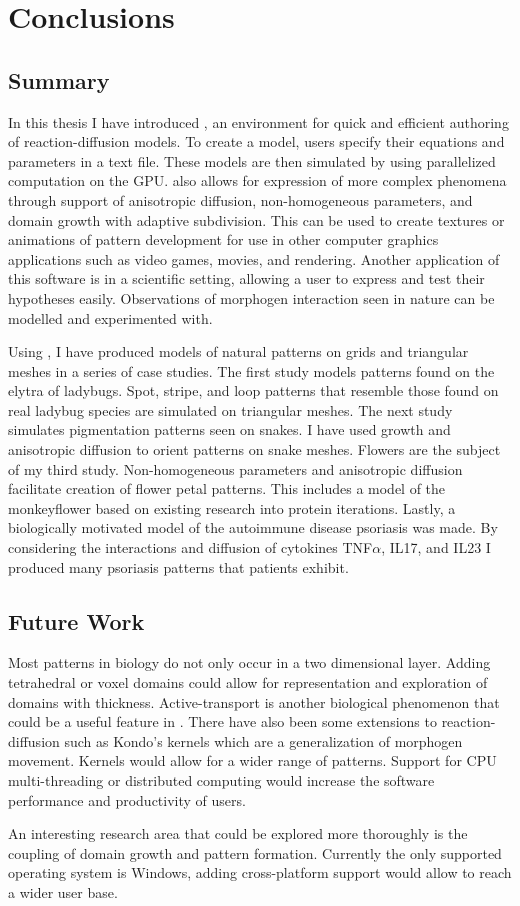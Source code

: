 \chapter{Conclusions}
\section{Summary}

In this thesis I have introduced \ProgramName{}, an environment for quick and efficient authoring of reaction-diffusion models. To create a model, users specify their equations and parameters in a text file. These models are then simulated by using parallelized computation on the GPU. \ProgramName{} also allows for expression of more complex phenomena through support of anisotropic diffusion, non-homogeneous parameters, and domain growth with adaptive subdivision. This can be used to create textures or animations of pattern development for use in other computer graphics applications such as video games, movies, and rendering. Another application of this software is in a scientific setting, allowing a user to express and test their hypotheses easily. Observations of morphogen interaction seen in nature can be modelled and experimented with.

Using \ProgramName{}, I have produced models of natural patterns on grids and triangular meshes in a series of case studies. The first study models patterns found on the elytra of ladybugs. Spot, stripe, and loop patterns that resemble those found on real ladybug species are simulated on triangular meshes. The next study simulates pigmentation patterns seen on snakes. I have used growth and anisotropic diffusion to orient patterns on snake meshes. Flowers are the subject of my third study. Non-homogeneous parameters and anisotropic diffusion facilitate creation of flower petal patterns. This includes a model of the monkeyflower based on existing research into protein iterations. Lastly, a biologically motivated model of the autoimmune disease psoriasis was made. By considering the interactions and diffusion of cytokines TNF$\alpha$, IL17, and IL23 I produced many psoriasis patterns that patients exhibit.

\section{Future Work}
Most patterns in biology do not only occur in a two dimensional layer. Adding tetrahedral or voxel domains could allow for representation and exploration of domains with thickness. Active-transport is another biological phenomenon that could be a useful feature in \ProgramName{}. There have also been some extensions to reaction-diffusion such as Kondo's kernels which are a generalization of morphogen movement. Kernels would allow for a wider range of patterns. Support for CPU multi-threading or distributed computing would increase the software performance and productivity of users. 

An interesting research area that could be explored more thoroughly is the coupling of domain growth and pattern formation. Currently the only supported operating system is Windows, adding cross-platform support would allow \ProgramName{} to reach a wider user base.